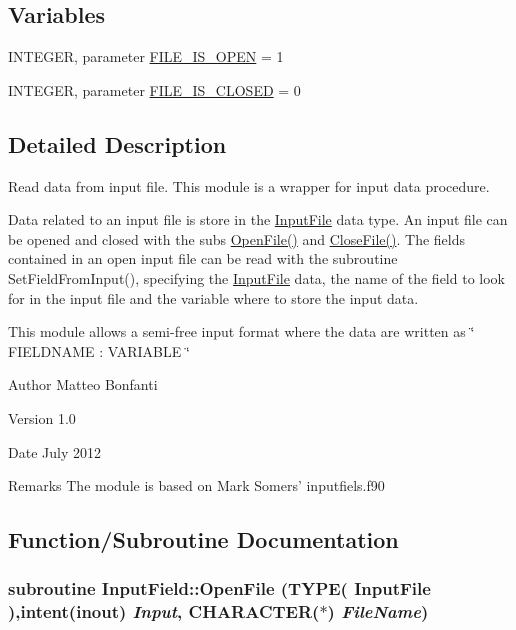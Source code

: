\subsection*{Variables}
\begin{DoxyCompactItemize}
\item 
INTEGER, parameter \hyperlink{namespace_input_field_ac271f9951500fb53f89b59f48c60e4d9}{FILE\_\-IS\_\-OPEN} = 1
\item 
INTEGER, parameter \hyperlink{namespace_input_field_a1408d7aae417ece86cc598019d1e5ff9}{FILE\_\-IS\_\-CLOSED} = 0
\end{DoxyCompactItemize}


\subsection{Detailed Description}
Read data from input file. This module is a wrapper for input data procedure. \par
 Data related to an input file is store in the \hyperlink{type_input_field_1_1_input_file}{InputFile} data type. An input file can be opened and closed with the subs \hyperlink{namespace_input_field_ab4dd5bd42a4fe952b9d298c46d09ac20}{OpenFile()} and \hyperlink{namespace_input_field_a2ff58fb6ffd3fe11782567af59bc26fa}{CloseFile()}. The fields contained in an open input file can be read with the subroutine SetFieldFromInput(), specifying the \hyperlink{type_input_field_1_1_input_file}{InputFile} data, the name of the field to look for in the input file and the variable where to store the input data. \par
 This module allows a semi-\/free input format where the data are written as \char`\"{} FIELDNAME : VARIABLE \char`\"{}\begin{DoxyAuthor}{Author}
Matteo Bonfanti 
\end{DoxyAuthor}
\begin{DoxyVersion}{Version}
1.0 
\end{DoxyVersion}
\begin{DoxyDate}{Date}
July 2012
\end{DoxyDate}
\begin{DoxyRemark}{Remarks}
The module is based on Mark Somers' inputfiels.f90 
\end{DoxyRemark}


\subsection{Function/Subroutine Documentation}
\hypertarget{namespace_input_field_ab4dd5bd42a4fe952b9d298c46d09ac20}{
\subsubsection[{OpenFile}]{\setlength{\rightskip}{0pt plus 5cm}subroutine InputField::OpenFile (TYPE( InputFile ),intent(inout) {\em Input}, \/  CHARACTER($\ast$) {\em FileName})}}
\label{namespace_input_field_ab4dd5bd42a4fe952b9d298c46d09ac20}


